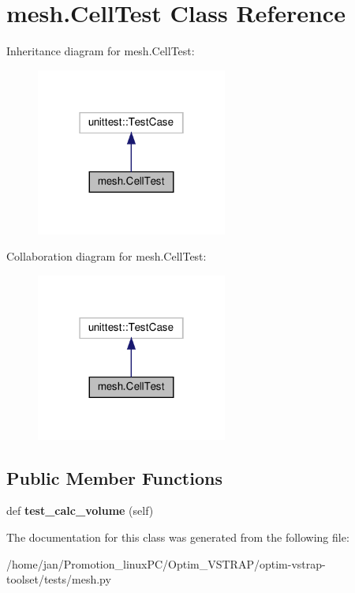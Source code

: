 \hypertarget{classmesh_1_1CellTest}{}\section{mesh.\+Cell\+Test Class Reference}
\label{classmesh_1_1CellTest}


Inheritance diagram for mesh.\+Cell\+Test\+:\nopagebreak
\begin{figure}[H]
\begin{center}
\leavevmode
\includegraphics[width=178pt]{classmesh_1_1CellTest__inherit__graph}
\end{center}
\end{figure}


Collaboration diagram for mesh.\+Cell\+Test\+:\nopagebreak
\begin{figure}[H]
\begin{center}
\leavevmode
\includegraphics[width=178pt]{classmesh_1_1CellTest__coll__graph}
\end{center}
\end{figure}
\subsection*{Public Member Functions}
\begin{DoxyCompactItemize}
\item 
\mbox{\label{classmesh_1_1CellTest_a30c9e7cb189f7303b72cd9e148810b87}} 
def {\bfseries test\+\_\+calc\+\_\+volume} (self)
\end{DoxyCompactItemize}


The documentation for this class was generated from the following file\+:\begin{DoxyCompactItemize}
\item 
/home/jan/\+Promotion\+\_\+linux\+P\+C/\+Optim\+\_\+\+V\+S\+T\+R\+A\+P/optim-\/vstrap-\/toolset/tests/mesh.\+py\end{DoxyCompactItemize}
